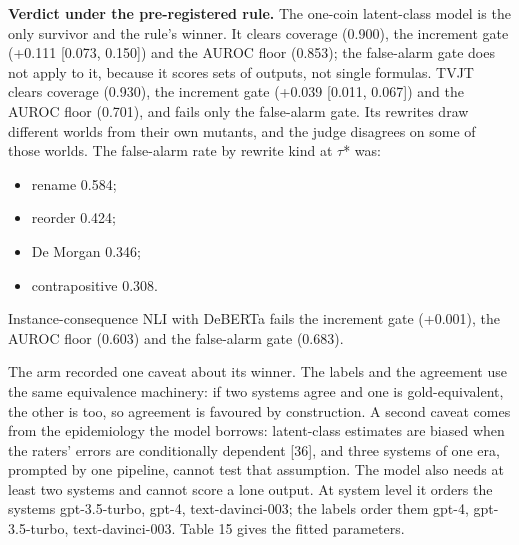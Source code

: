 \documentclass[11pt,letterpaper]{article}
\begin{document}
\textbf{Verdict under the pre-registered rule.} The one-coin latent-class model is the only survivor and the rule's winner. It clears coverage (0.900), the increment gate (+0.111 [0.073, 0.150]) and the AUROC floor (0.853); the false-alarm gate does not apply to it, because it scores sets of outputs, not single formulas. TVJT clears coverage (0.930), the increment gate (+0.039 [0.011, 0.067]) and the AUROC floor (0.701), and fails only the false-alarm gate. Its rewrites draw different worlds from their own mutants, and the judge disagrees on some of those worlds. The false-alarm rate by rewrite kind at $\tau$* was:

\begin{itemize}
\item {}rename 0.584;
\item {}reorder 0.424;
\item {}De Morgan 0.346;
\item {}contrapositive 0.308.
\end{itemize}
Instance-consequence NLI with DeBERTa fails the increment gate (+0.001), the AUROC floor (0.603) and the false-alarm gate (0.683).

The arm recorded one caveat about its winner. The labels and the agreement use the same equivalence machinery: if two systems agree and one is gold-equivalent, the other is too, so agreement is favoured by construction. A second caveat comes from the epidemiology the model borrows: latent-class estimates are biased when the raters' errors are conditionally dependent [36], and three systems of one era, prompted by one pipeline, cannot test that assumption. The model also needs at least two systems and cannot score a lone output. At system level it orders the systems gpt-3.5-turbo, gpt-4, text-davinci-003; the labels order them gpt-4, gpt-3.5-turbo, text-davinci-003. Table 15 gives the fitted parameters.
\end{document}
